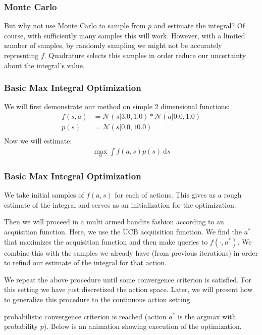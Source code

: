 \documentclass[9pt]{beamer}
\begin{document}
\begin{frame}
\frametitle{Monte Carlo}
But why not use Monte Carlo to sample from $p$ and estimate the integral?
\newline\newline
Of course, with sufficiently many samples this will work. However, with a limited number of samples, by randomly sampling we might not be accurately represnting $f$. Quadrature selects this samples in order reduce our uncertainty about the integral's value.
\end{frame}

\begin{frame}
\frametitle{Basic Max Integral Optimization}
We will first demonstrate our method on simple 2 dimensional functions:
\begin{equation*}
\begin{split}
   f(s,a) &= \mathcal{N}(s | 3.0, 1.0) * \mathcal{N}(a | 0.0, 1.0) \\
   p(s) &= \mathcal{N}(s | 0.0, 10.0) \\
\end{split}
\end{equation*}
Now we will estimate:
\begin{equation*}
\begin{split}
   \max_{a} \int f(a,s) p(s) \ \text{d}s
\end{split}
\end{equation*}
\end{frame}

\begin{frame}
\frametitle{Basic Max Integral Optimization}
We take initial samples of $f(a,s)$ for each of actions. This gives us a rough estimate of the integral and serves as an initialization for the optimization.\newline \newline

Then we will proceed in a multi armed bandits fashion according to an acquisition function. Here, we use the UCB acquisition function. We find the $a^*$ that maximizes the acquisition function and then make queries to $f(\cdot , a^*)$. We combine this with the samples we already have (from previous iterations) in order to refind our estimate of the integral for that action.\newline \newline

We repeat the above procedure until some convergence criterion is satisfied. For this setting we have just discretized the action space. Later, we will present how to generalize this procedure to the continuous action setting.\newline \newline

probabilistic convergence criterion is reached (action $a^*$ is the argmax with probability $p$). Below is an animation showing execution of the optimization.
\end{frame}
\end{document}

